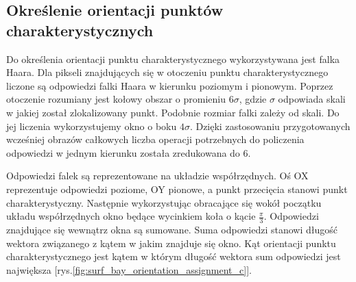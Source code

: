 \subsection{Określenie orientacji punktów charakterystycznych}
Do określenia orientacji punktu charakterystycznego wykorzystywana jest falka Haara. Dla pikseli znajdujących się w otoczeniu punktu charakterystycznego liczone są odpowiedzi falki Haara w kierunku poziomym i pionowym. Poprzez otoczenie rozumiany jest kołowy obszar o promieniu $6\sigma$, gdzie $\sigma$ odpowiada skali w jakiej został zlokalizowany punkt. Podobnie rozmiar falki zależy od skali. Do jej liczenia wykorzystujemy okno o boku $4\sigma$. Dzięki zastosowaniu przygotowanych wcześniej obrazów całkowych liczba operacji potrzebnych do policzenia odpowiedzi w jednym kierunku została zredukowana do 6.


Odpowiedzi falek są reprezentowane na układzie współrzędnych. Oś OX reprezentuje odpowiedzi poziome, OY pionowe, a punkt przecięcia stanowi punkt charakterystyczny. Następnie wykorzystując obracające się wokół początku układu współrzędnych okno będące wycinkiem koła o kącie $\frac{\pi}{3}$. Odpowiedzi znajdujące się wewnątrz okna są sumowane. Suma odpowiedzi stanowi długość wektora związanego z kątem w jakim znajduje się okno. Kąt orientacji punktu charakterystycznego jest kątem w którym długość wektora sum odpowiedzi jest największa [rys.\ref{fig:surf_bay_orientation_assignment_c}].

